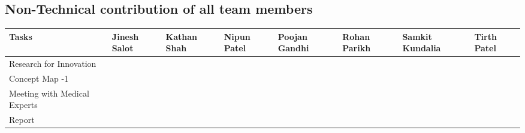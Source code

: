 \documentclass{article}
\begin{document}
\subsection{Non-Technical contribution of all team members }
\begin{table}[H]
		\begin{tabular}{|p{3.8154cm}|p{1.4154cm}|p{1.4154cm}|p{1.4154cm}|p{1.4154cm}|p{1.4154cm}|p{1.4154cm}|p{1.4154cm}|}
			\hline
			Tasks  & Jinesh Salot & Kathan Shah & Nipun Patel & Poojan Gandhi & Rohan Parikh & Samkit Kundalia & Tirth Patel \\ \hline
			Research for Innovation &  {\Large \checkmark}    & {\Large \checkmark}      &{\Large \checkmark}        &  {\Large \checkmark}        & {\Large \checkmark}    &   {\Large \checkmark}    &  {\Large \checkmark}       \\ \hline
			Concept Map -1 &   {\Large \checkmark}   &  {\Large \checkmark}     &        &   {\Large \checkmark}       &     &      &  {\Large \checkmark}       \\ \hline
			Meeting with Medical Experts &      &  {\Large \checkmark}     &    {\Large \checkmark}    &          &   {\Large \checkmark}  &   {\Large \checkmark}    &       \\ \hline
			Report & {\Large \checkmark}     &       &   {\Large \checkmark}     &          & {\Large \checkmark}    &  {\Large \checkmark}     & {\Large \checkmark}      \\ \hline
		\end{tabular}
\end{table}
\end{document}
